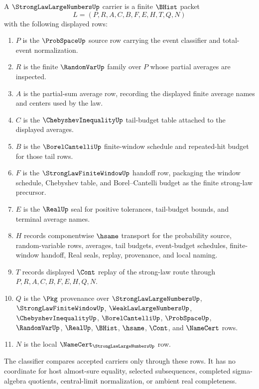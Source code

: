 \begin{definition}
\label{def:strong-law-large-numbers-carrier}
A $\StrongLawLargeNumbersUp$ carrier is a finite $\BHist$ packet
$$
L=(P,R,A,C,B,F,E,H,T,Q,N)
$$
with the following displayed rows:
\begin{enumerate}
\item $P$ is the $\ProbSpaceUp$ source row carrying the event classifier and total-event normalization.
\item $R$ is the finite $\RandomVarUp$ family over $P$ whose partial averages are inspected.
\item $A$ is the partial-sum average row, recording the displayed finite average names and centers used by the law.
\item $C$ is the $\ChebyshevInequalityUp$ tail-budget table attached to the displayed averages.
\item $B$ is the $\BorelCantelliUp$ finite-window schedule and repeated-hit budget for those tail rows.
\item $F$ is the $\StrongLawFiniteWindowUp$ handoff row, packaging the window schedule, Chebyshev table, and Borel--Cantelli budget as the finite strong-law precursor.
\item $E$ is the $\RealUp$ seal for positive tolerances, tail-budget bounds, and terminal average names.
\item $H$ records componentwise $\hsame$ transport for the probability source, random-variable rows, averages, tail budgets, event-budget schedules, finite-window handoff, Real seals, replay, provenance, and local naming.
\item $T$ records displayed $\Cont$ replay of the strong-law route through $P,R,A,C,B,F,E,H,Q,N$.
\item $Q$ is the $\Pkg$ provenance over $\StrongLawLargeNumbersUp$, $\StrongLawFiniteWindowUp$, $\WeakLawLargeNumbersUp$, $\ChebyshevInequalityUp$, $\BorelCantelliUp$, $\ProbSpaceUp$, $\RandomVarUp$, $\RealUp$, $\BHist$, $\hsame$, $\Cont$, and $\NameCert$ rows.
\item $N$ is the local $\NameCert_{\StrongLawLargeNumbersUp}$ row.
\end{enumerate}
The classifier compares accepted carriers only through these rows. It has no coordinate for host almost-sure equality, selected subsequences, completed sigma-algebra quotients, central-limit normalization, or ambient real completeness.
\end{definition}

